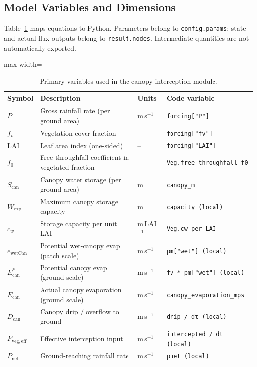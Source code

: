 \documentclass[12pt]{article}
\begin{document}
\subsection{Model Variables and Dimensions}

Table~\ref{tab:canopy_vars} maps equations to Python. Parameters belong to \texttt{config.params}; state and actual-flux outputs belong to \texttt{result.nodes}. Intermediate quantities are not automatically exported.

\begin{table}[H]
\centering
\caption{Primary variables used in the canopy interception module.}
\label{tab:canopy_vars}
\begin{adjustbox}{max width=\linewidth}\begin{tabular}{llll}
\toprule
Symbol & Description & Units & Code variable \\
\midrule
\(P\) & Gross rainfall rate (per ground area) & m\,s\(^{-1}\) & \texttt{forcing["P"]} \\
\(f_v\) & Vegetation cover fraction & -- & \texttt{forcing["fv"]} \\
LAI & Leaf area index (one-sided) & -- & \texttt{forcing["LAI"]} \\
\(f_0\) & Free-throughfall coefficient in vegetated fraction & -- & \texttt{Veg.free\_throughfall\_f0} \\
\(S_{\mathrm{can}}\) & Canopy water storage (per ground area) & m & \texttt{canopy\_m} \\
\(W_{\mathrm{cap}}\) & Maximum canopy storage capacity & m & \texttt{capacity (local)} \\
\(c_w\) & Storage capacity per unit LAI & m\,LAI\(^{-1}\) & \texttt{Veg.cw\_per\_LAI} \\
\(e_{\mathrm{wetCan}}\) & Potential wet-canopy evap (patch scale) & m\,s\(^{-1}\) & \texttt{pm["wet"] (local)} \\
\(E_{\mathrm{can}}^{\ast}\) & Potential canopy evap (ground scale) & m\,s\(^{-1}\) & \texttt{fv * pm["wet"] (local)} \\
\(E_{\mathrm{can}}\) & Actual canopy evaporation (ground scale) & m\,s\(^{-1}\) & \texttt{canopy\_evaporation\_mps} \\
\(D_{\mathrm{can}}\) & Canopy drip / overflow to ground & m\,s\(^{-1}\) & \texttt{drip / dt (local)} \\
\(P_{\mathrm{veg,eff}}\) & Effective interception input & m\,s\(^{-1}\) & \texttt{intercepted / dt (local)} \\
\(P_{\mathrm{net}}\) & Ground-reaching rainfall rate & m\,s\(^{-1}\) & \texttt{pnet (local)} \\
\bottomrule
\end{tabular}\end{adjustbox}
\end{table}
\end{document}

